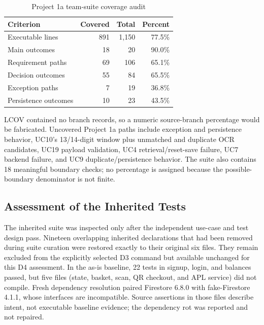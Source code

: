 \documentclass[sigconf]{acmart}
\begin{document}
\begin{table}[H]
  \caption{Project 1a team-suite coverage audit}
  \label{tab:coverage}
  \centering
  \small
  \begin{tabular}{lrrr}
    \toprule
    Criterion & Covered & Total & Percent \\
    \midrule
    Executable lines & 891 & 1,150 & 77.5\% \\
    Main outcomes & 18 & 20 & 90.0\% \\
    Requirement paths & 69 & 106 & 65.1\% \\
    Decision outcomes & 55 & 84 & 65.5\% \\
    Exception paths & 7 & 19 & 36.8\% \\
    Persistence outcomes & 10 & 23 & 43.5\% \\
    \bottomrule
  \end{tabular}
\end{table}

LCOV contained no branch records, so a numeric source-branch percentage would
be fabricated. Uncovered Project 1a paths include exception and persistence
behavior, UC10's 13/14-digit window plus unmatched and duplicate OCR
candidates, UC19 payload validation, UC4 retrieval/reset-save failure, UC7
backend failure, and UC9 duplicate/persistence behavior. The suite also
contains 18 meaningful boundary checks; no percentage is assigned because the
possible-boundary denominator is not finite.

\subsection{Assessment of the Inherited Tests}

The inherited suite was inspected only after the independent use-case and test
design pass. Nineteen overlapping inherited declarations that had been removed
during suite curation were restored exactly to their original six files. They
remain excluded from the explicitly selected D3 command but available unchanged
for this D4 assessment. In the as-is baseline, 22 tests in signup, login, and balances
passed, but five files (state, basket, scan, QR checkout, and APL service) did
not compile. Fresh dependency resolution paired Firestore 6.8.0 with
fake-Firestore 4.1.1, whose  interfaces are
incompatible. Source assertions in those files describe intent, not executable
baseline evidence; the dependency rot was reported and not repaired.
\end{document}
